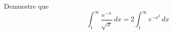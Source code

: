 \item Demuestre que
    \[ \int_1^\infty \frac{e^{-x}}{\sqrt{x}} \, dx = 2 \int_1^\infty e^{-x^2} \, dx \]
